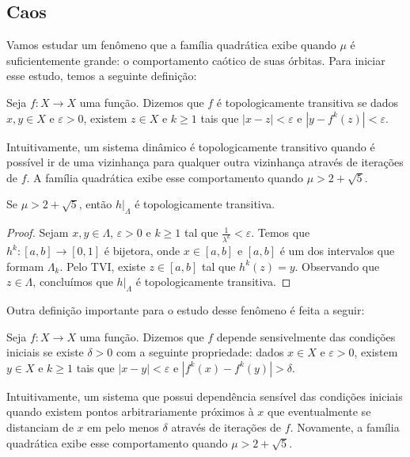 \subsection{Caos}

Vamos estudar um fenômeno que a família quadrática exibe quando $\mu$ é suficientemente grande: o comportamento caótico de suas órbitas.
Para iniciar esse estudo, temos a seguinte definição:

\begin{definition}
Seja $f: X \to X$ uma função. Dizemos que $f$ é topologicamente transitiva se dados $x, y \in X$ e $\varepsilon > 0$,  existem $z \in X$ e $k \geq 1$ tais que $|x - z| < \varepsilon$ e $|y - f^k(z)| < \varepsilon$.
\end{definition} 

Intuitivamente, um sistema dinâmico é topologicamente transitivo quando é possível ir de uma vizinhança para qualquer outra vizinhança através de iterações de $f$. A família quadrática exibe esse comportamento quando $\mu > 2 + \sqrt{5}$.

\begin{proposition}
Se $\mu > 2 + \sqrt{5}$, então $h|_\Lambda$ é topologicamente transitiva.
\end{proposition}

\begin{proof}
Sejam $x, y \in \Lambda$, $\varepsilon > 0$ e $k \geq 1$ tal que $\frac{1}{\lambda^k} < \varepsilon$.
Temos que $h^k: [a, b] \to [0, 1]$ é bijetora, onde $x \in [a, b]$ e $[a, b]$ é um dos intervalos que formam $\Lambda_k$. Pelo TVI, existe $z \in [a, b]$ tal que $h^k(z) = y$. Observando que $z \in \Lambda$, concluímos que $h|_\Lambda$ é topologicamente transitiva.
\end{proof}

Outra definição importante para o estudo desse fenômeno é feita a seguir:

\begin{definition}
Seja $f: X \to X$ uma função. Dizemos que $f$ depende sensivelmente das condições iniciais se existe $\delta > 0$ com a seguinte propriedade: dados $x \in X$ e $\varepsilon > 0$, existem $y \in X$ e $k \geq 1$ tais que $|x - y| < \varepsilon$ e $|f^k(x) - f^k(y)| > \delta$.
\end{definition}

Intuitivamente, um sistema que possui dependência sensível das condições iniciais quando existem pontos arbitrariamente próximos à $x$ que eventualmente se distanciam de $x$ em pelo menos $\delta$ através de iterações de $f$. Novamente, a família quadrática exibe esse comportamento quando $\mu > 2 + \sqrt{5}$.

